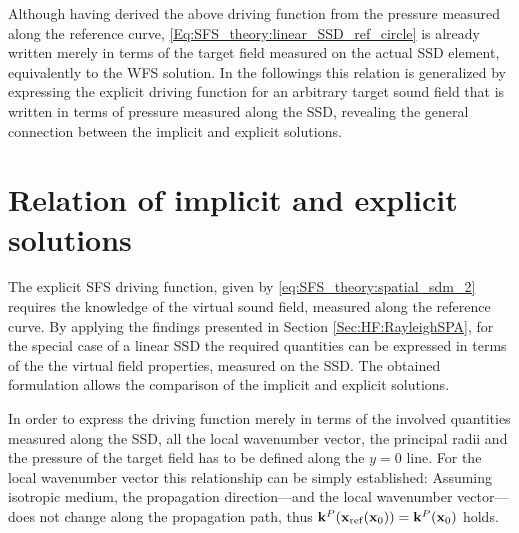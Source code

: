 Although having derived the above driving function from the pressure measured along the reference curve, \eqref{Eq:SFS_theory:linear_SSD_ref_circle} is already written merely in terms of the target field measured on the actual SSD element, equivalently to the WFS solution.
In the followings this relation is generalized by expressing the explicit driving function for an arbitrary target sound field that is written in terms of pressure measured along the SSD, revealing the general connection between the implicit and explicit solutions.

\section{Relation of implicit and explicit solutions}

The explicit SFS driving function, given by \eqref{eq:SFS_theory:spatial_sdm_2} requires the knowledge of the virtual sound field, measured along the reference curve.
By applying the findings presented in Section \ref{Sec:HF:RayleighSPA}, for the special case of a linear SSD the required quantities can be expressed in terms of the the virtual field properties, measured on the SSD. 
The obtained formulation allows the comparison of the implicit and explicit solutions.

In order to express the driving function merely in terms of the involved quantities measured along the SSD, all the local wavenumber vector, the principal radii and the pressure of the target field has to be defined along the $y=0$ line.
For the local wavenumber vector this relationship can be simply established: Assuming isotropic medium, the propagation direction---and the local wavenumber vector---does not change along the propagation path, thus $\mathbf{k}^P(\mathbf{x}_{\mathrm{ref}}(\mathbf{x}_0)) = \mathbf{k}^P(\mathbf{x}_0)$ holds.

